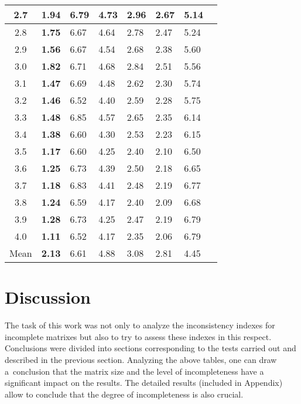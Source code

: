 \begin{table}[!ht]
\begin{center}
\begin{tabular}{|c||lllll||l|c|}
2.7 & \textbf{1.94} & 6.79 & 4.73 & 2.96 & 2.67 & 5.14 \\ \hline
2.8 & \textbf{1.75} & 6.67 & 4.64 & 2.78 & 2.47 & 5.24 \\ \hline
2.9 & \textbf{1.56} & 6.67 & 4.54 & 2.68 & 2.38 & 5.60 \\ \hline
3.0 & \textbf{1.82} & 6.71 & 4.68 & 2.84 & 2.51 & 5.56 \\ \hline
3.1 & \textbf{1.47} & 6.69 & 4.48 & 2.62 & 2.30 & 5.74 \\ \hline
3.2 & \textbf{1.46} & 6.52 & 4.40 & 2.59 & 2.28 & 5.75 \\ \hline
3.3 & \textbf{1.48} & 6.85 & 4.57 & 2.65 & 2.35 & 6.14 \\ \hline
3.4 & \textbf{1.38} & 6.60 & 4.30 & 2.53 & 2.23 & 6.15 \\ \hline
3.5 & \textbf{1.17} & 6.60 & 4.25 & 2.40 & 2.10 & 6.50 \\ \hline
3.6 & \textbf{1.25} & 6.73 & 4.39 & 2.50 & 2.18 & 6.65 \\ \hline
3.7 & \textbf{1.18} & 6.83 & 4.41 & 2.48 & 2.19 & 6.77 \\ \hline
3.8 & \textbf{1.24} & 6.59 & 4.17 & 2.40 & 2.09 & 6.68 \\ \hline
3.9 & \textbf{1.28} & 6.73 & 4.25 & 2.47 & 2.19 & 6.79 \\ \hline
4.0 & \textbf{1.11} & 6.52 & 4.17 & 2.35 & 2.06 & 6.79 \\ \hline \hline
Mean & \textbf{2.13} & 6.61 & 4.88 & 3.08 & 2.81 & 4.45 \\ \hline 
\end{tabular}
\end{center}
\end{table}

\section{Discussion}
The task of this work was not only to analyze the inconsistency indexes for incomplete matrixes but also to try to assess these indexes in this respect. Conclusions were divided into sections corresponding to the tests carried out and described in the previous section. Analyzing the above tables, one can draw a~conclusion that the matrix size and the level of incompleteness have a significant impact on the results. The detailed results (included in Appendix) allow to conclude that the degree of incompleteness is also crucial.

\newpage
